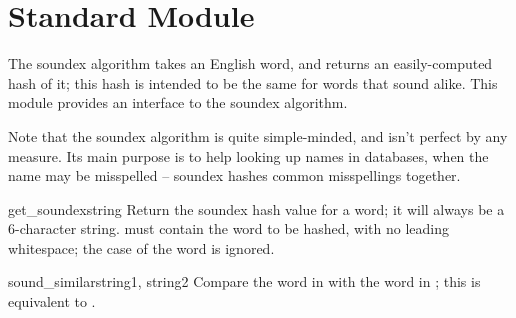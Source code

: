 \section{Standard Module }
\label{module-soundex}

\renewcommand{\indexsubitem}{(in module soundex)}
The soundex algorithm takes an English word, and returns an
easily-computed hash of it; this hash is intended to be the same for
words that sound alike.  This module provides an interface to the
soundex algorithm.

Note that the soundex algorithm is quite simple-minded, and isn't
perfect by any measure.  Its main purpose is to help looking up names
in databases, when the name may be misspelled -- soundex hashes common
misspellings together.

\begin{funcdesc}{get_soundex}{string}
Return the soundex hash value for a word; it will always be a
6-character string.   must contain the word to be hashed,
with no leading whitespace; the case of the word is ignored.
\end{funcdesc}

\begin{funcdesc}{sound_similar}{string1, string2}
Compare the word in  with the word in ; this
is equivalent to 
.
\end{funcdesc}
